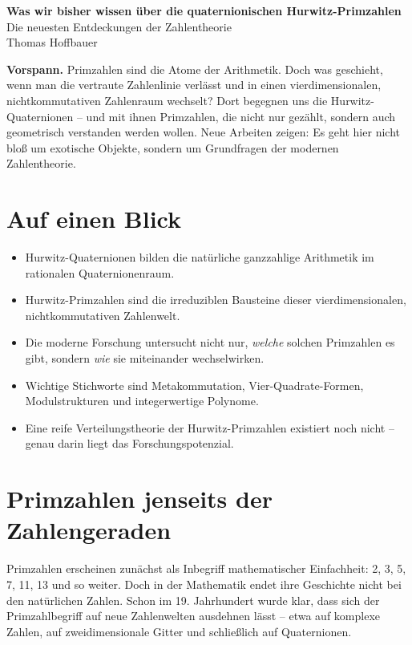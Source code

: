 \documentclass[11pt,a4paper]{article}
\begin{document}
	
	\begin{center}
		{\LARGE \bfseries Was wir bisher wissen über die quaternionischen Hurwitz-Primzahlen}\\[0.5em]
		{\large Die neuesten Entdeckungen der Zahlentheorie}\\[1.2em]
		{\normalsize Thomas Hoffbauer}\\[1.5em]
	\end{center}
	
	\noindent\textbf{Vorspann.}
	Primzahlen sind die Atome der Arithmetik. Doch was geschieht, wenn man die vertraute Zahlenlinie verlässt und in einen vierdimensionalen, nichtkommutativen Zahlenraum wechselt? Dort begegnen uns die Hurwitz-Quaternionen -- und mit ihnen Primzahlen, die nicht nur gezählt, sondern auch geometrisch verstanden werden wollen. Neue Arbeiten zeigen: Es geht hier nicht bloß um exotische Objekte, sondern um Grundfragen der modernen Zahlentheorie.
	
	\section*{Auf einen Blick}
	
	\begin{itemize}[leftmargin=1.5em]
		\item Hurwitz-Quaternionen bilden die natürliche ganzzahlige Arithmetik im rationalen Quaternionenraum.
		\item Hurwitz-Primzahlen sind die irreduziblen Bausteine dieser vierdimensionalen, nichtkommutativen Zahlenwelt.
		\item Die moderne Forschung untersucht nicht nur, \emph{welche} solchen Primzahlen es gibt, sondern \emph{wie} sie miteinander wechselwirken.
		\item Wichtige Stichworte sind Metakommutation, Vier-Quadrate-Formen, Modulstrukturen und integerwertige Polynome.
		\item Eine reife Verteilungstheorie der Hurwitz-Primzahlen existiert noch nicht -- genau darin liegt das Forschungspotenzial.
	\end{itemize}
	
	\section*{Primzahlen jenseits der Zahlengeraden}
	
	Primzahlen erscheinen zunächst als Inbegriff mathematischer Einfachheit: 2, 3, 5, 7, 11, 13 und so weiter. Doch in der Mathematik endet ihre Geschichte nicht bei den natürlichen Zahlen. Schon im 19. Jahrhundert wurde klar, dass sich der Primzahlbegriff auf neue Zahlenwelten ausdehnen lässt -- etwa auf komplexe Zahlen, auf zweidimensionale Gitter und schließlich auf Quaternionen.
	
\end{document}
